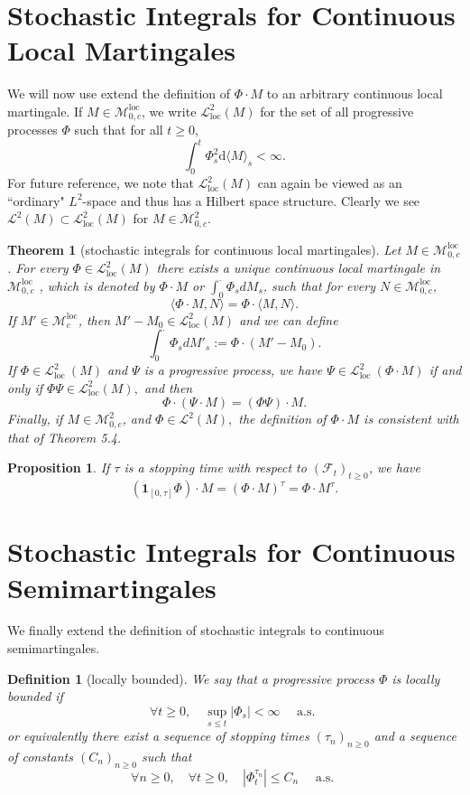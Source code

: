 \documentclass{report}
\newtheorem{definition}{Definition}[section]
\newtheorem{proposition}{Proposition}[section]
\newtheorem{theorem}{Theorem}[section]
\theoremstyle{nonumberplain}
\begin{document}
\section{Stochastic Integrals for Continuous Local Martingales}

We will now use extend the definition of $\Phi \cdot M$ to an arbitrary continuous local martingale. If $M\in\mathscr{M}^{\mathrm{loc}}_{0,c}$, we write $\mathscr{L}_{\mathrm{loc}}^{2}(M)$ for the set of all progressive processes $\Phi$ such that for all $t\ge0$,
\[
\int_{0}^{t} \Phi_{s}^{2} \mathrm{d}\langle M\rangle_{s}<\infty.
\]
For future reference, we note that $\mathscr{L}_{\mathrm{loc}}^{2}(M)$ can again be viewed as an ``ordinary" $L^{2}$-space and thus has a Hilbert space structure. Clearly we see $\mathscr{L}^{2}(M)\subset\mathscr{L}_{\mathrm{loc}}^{2}(M)$ for $M\in\mathscr{M}^{2}_{0,c}$.


\begin{theorem}[stochastic integrals for continuous local martingales]
	Let $M\in\mathscr{M}^{\mathrm{loc}}_{0,c}$. For every $\Phi \in \mathscr{L}_{\mathrm{loc}}^{2}(M)$ there exists a unique continuous local martingale in $\mathscr{M}^{\mathrm{loc}}_{0,c}$ , which is denoted by $\Phi \cdot M$ or $\int_{0}^{\cdot}\Phi_sdM_s$, such that for every $N\in\mathscr{M}^{\mathrm{loc}}_{0,c}$,
	\[
	\langle \Phi \cdot M, N\rangle= \Phi \cdot\langle M, N\rangle.
	\]
	If $M'\in\mathscr{M}^{\mathrm{loc}}_{c}$, then $M'-M_0\in \mathscr{L}_{\mathrm{loc}}^{2}(M)$ and we can define
	\[
	\int_{0}^{\cdot}\Phi_sdM'_s:=\Phi\cdot(M'-M_0).
	\]
	If $\Phi \in \mathscr{L}_{\text {loc }}^{2}(M)$ and $\Psi$ is a progressive process, we have $\Psi \in \mathscr{L}_{\text {loc }}^{2}(\Phi \cdot M)$ if and only if $\Phi \Psi \in \mathscr{L}_{\mathrm{loc}}^{2}(M),$ and then
	\[
	\Phi \cdot(\Psi \cdot M)=(\Phi \Psi) \cdot M.
	\]
	Finally, if $M\in\mathscr{M}^{2}_{0,c}$, and $\Phi \in\mathscr{L}^{2}(M),$ the definition of $\Phi \cdot M$ is consistent with that of Theorem 5.4.
\end{theorem}

\begin{proposition}
	If $\tau$ is a stopping time with respect to $(\mathcal{F}_t)_{t\ge0}$, we have
	\[
	\left(\mathbf{1}_{[0, \tau]} \Phi\right) \cdot M=(\Phi \cdot M)^{\tau}=\Phi \cdot M^{\tau}.
	\]
\end{proposition}

\section{Stochastic Integrals for Continuous Semimartingales}
We finally extend the definition of stochastic integrals to continuous semimartingales. 
\begin{definition}[locally bounded]
We say that a progressive process $\Phi$ is locally bounded if
\[
\forall t \geq 0, \quad \sup _{s \leq t}\left|\Phi_{s}\right|<\infty \quad \text { a.s. }
\]
or equivalently there exist a sequence of stopping times $(\tau_{n})_{n \geq 0}$ and a sequence of constants $(C_n)_{n \geq 0}$ such that
\[
\forall n \geq 0, \quad \forall t \geq 0, \quad \left|\Phi_{t}^{\tau_{n}}\right| \leq C_{n}\quad \text { a.s. }
\]
\end{definition}
\end{document}

